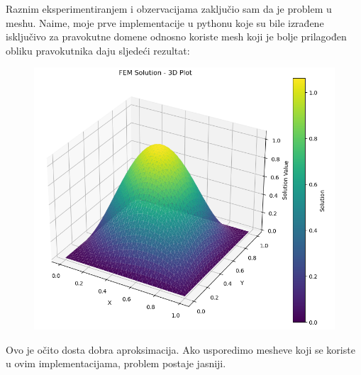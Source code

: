 \documentclass[zavrsnirad]{../fer}
\begin{document}
\newpage
Raznim eksperimentiranjem i obzervacijama zaključio sam da je problem
u meshu. Naime, moje prve implementacije u pythonu koje su bile izrađene isključivo 
za pravokutne domene odnosno koriste mesh 
koji je bolje prilagođen obliku pravokutnika daju sljedeći rezultat:

\begin{figure}[H]
	\centering
	\includegraphics[width=1.15\linewidth]{Figures/numersinsin.png}
	\caption{}
  \label{numerSinSin}
\end{figure}
Ovo je očito dosta dobra aproksimacija.
\newpage
Ako usporedimo mesheve koji se koriste u ovim implementacijama,
problem postaje jasniji.
\end{document}
